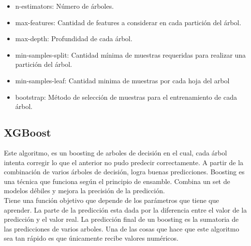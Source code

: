 \documentclass[12pt,a4paper]{article}
\begin{document}
\begin{itemize}
    \item n-estimators: Número de árboles.
    
    \item max-features: Cantidad de features a considerar en cada partición del árbol.
    
    \item max-depth: Profundidad de cada árbol.
    
    \item min-samples-split: Cantidad mínima de muestras requeridas para realizar una partición del árbol.
    
    \item min-samples-leaf: Cantidad minima de muestras por cada hoja del arbol
    
    \item bootstrap: Método de selección de muestras para el entrenamiento de cada árbol.
    
\end{itemize}

\subsection{XGBoost}
Este algoritmo, es un boosting de arboles de decisión en el cual, cada árbol intenta corregir lo que el anterior no pudo predecir correctamente. A partir de la combinación de varios árboles de decisión, logra buenas predicciones. Boosting es una técnica que funciona según el principio de ensamble. Combina un set de modelos débiles y mejora la precisión de la predicción.\\
Tiene una función objetivo que depende de los parámetros que tiene que aprender. La parte de la predicción esta dada por la diferencia entre el valor de la predicción y el valor real. La predicción final de un boosting es la sumatoria de las predicciones de varios arboles. Una de las cosas que hace que este algoritmo sea tan rápido es que únicamente recibe valores numéricos.
 
\end{document}
